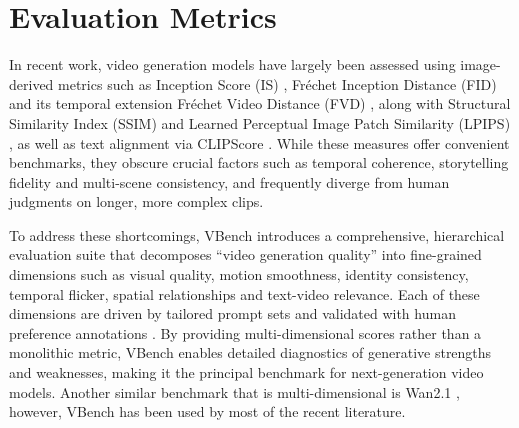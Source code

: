 \section{Evaluation Metrics}
\label{sec:eval}
In recent work, video generation models have largely been assessed using image-derived metrics such as Inception Score (IS) \cite{Salimans2016}, Fréchet Inception Distance (FID) \cite{Heusel2017} and its temporal extension Fréchet Video Distance (FVD) \cite{Unterthiner2019}, along with Structural Similarity Index (SSIM) \cite{wang2004image} and Learned Perceptual Image Patch Similarity (LPIPS) \cite{zhang2018unreasonable}, as well as text alignment via CLIPScore \cite{Hessel2021}. While these measures offer convenient benchmarks, they obscure crucial factors such as temporal coherence, storytelling fidelity and multi-scene consistency, and frequently diverge from human judgments on longer, more complex clips.

To address these shortcomings, VBench introduces a comprehensive, hierarchical evaluation suite that decomposes “video generation quality” into fine-grained dimensions such as visual quality, motion smoothness, identity consistency, temporal flicker, spatial relationships and text-video relevance. Each of these dimensions are driven by tailored prompt sets and validated with human preference annotations \cite{Huang2024}. By providing multi-dimensional scores rather than a monolithic metric, VBench enables detailed diagnostics of generative strengths and weaknesses, making it the principal benchmark for next-generation video models. Another similar benchmark that is multi-dimensional is Wan2.1 \cite{wan2025}, however, VBench has been used by most of the recent literature.